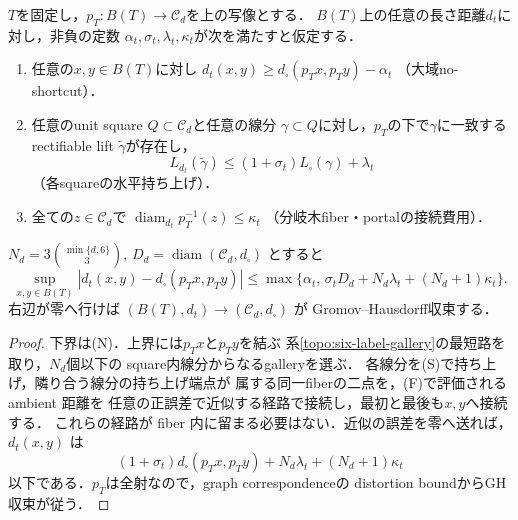 \begin{proposition}
\label{topo:finite-portal-criterion}
$T$を固定し，$p_T:B(T)\to\mathcal C_d$を上の写像とする．
$B(T)$上の任意の長さ距離$d_t$に対し，非負の定数
$\alpha_t,\sigma_t,\lambda_t,\kappa_t$が次を満たすと仮定する．
\begin{enumerate}
\item[\textup{(N)}]
任意の$x,y\in B(T)$に対し
$d_t(x,y)\ge d_\square(p_Tx,p_Ty)-\alpha_t$
（大域no-shortcut）．
\item[\textup{(S)}]
任意のunit square $Q\subset\mathcal C_d$と任意の線分
$\gamma\subset Q$に対し，$p_T$の下で$\gamma$に一致する
rectifiable lift $\widetilde\gamma$が存在し，
\[
 L_{d_t}(\widetilde\gamma)\le
 (1+\sigma_t)L_\square(\gamma)+\lambda_t
\]
（各squareの水平持ち上げ）．
\item[\textup{(F)}]
全ての$z\in\mathcal C_d$で
$\operatorname{diam}_{d_t}p_T^{-1}(z)\le\kappa_t$
（分岐木fiber・portalの接続費用）．
\end{enumerate}
$N_d=3\binom{\min\{d,6\}}{3}$, $D_d=\operatorname{diam}(\mathcal C_d,d_\square)$
とすると
\[
 \sup_{x,y\in B(T)}
 |d_t(x,y)-d_\square(p_Tx,p_Ty)|
 \le\max\{\alpha_t,\,
       \sigma_tD_d+N_d\lambda_t+(N_d+1)\kappa_t\}.
\]
右辺が零へ行けば
$(B(T),d_t)\to(\mathcal C_d,d_\square)$ が
Gromov--Hausdorff収束する．
\end{proposition}
\begin{proof}
下界は\textup{(N)}．上界には$p_Tx$と$p_Ty$を結ぶ
系\ref{topo:six-label-gallery}の最短路を取り，$N_d$個以下の
square内線分からなるgalleryを選ぶ．
各線分を\textup{(S)}で持ち上げ，隣り合う線分の持ち上げ端点が
属する同一fiberの二点を，\textup{(F)}で評価される ambient 距離を
任意の正誤差で近似する経路で接続し，最初と最後も$x,y$へ接続する．
これらの経路が fiber 内に留まる必要はない．近似の誤差を零へ送れば，$d_t(x,y)$ は
\[
 (1+\sigma_t)d_\square(p_Tx,p_Ty)
   +N_d\lambda_t+(N_d+1)\kappa_t
\]
以下である．$p_T$は全射なので，graph correspondenceの
distortion boundからGH収束が従う．
\end{proof}

